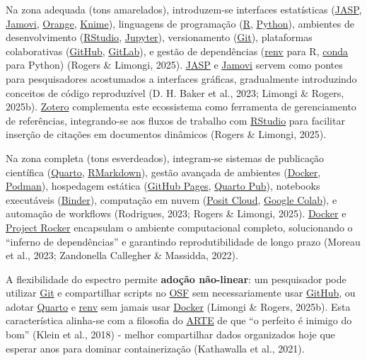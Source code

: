 \documentclass[
  a4paper,
]{book}
\begin{document}
Na zona adequada (tons amarelados), introduzem-se interfaces
estatísticas (\href{https://jasp-stats.org/}{JASP},
\href{https://www.jamovi.org/}{Jamovi},
\href{https://orangedatamining.com/}{Orange},
\href{https://www.knime.com/}{Knime}), linguagens de programação
(\href{https://www.r-project.org/}{R},
\href{https://www.python.org/}{Python}), ambientes de desenvolvimento
(\href{https://posit.co/products/open-source/rstudio/}{RStudio},
\href{https://jupyter.org/}{Jupyter}), versionamento
(\href{https://git-scm.com/}{Git}), plataformas colaborativas
(\href{https://github.com/}{GitHub},
\href{https://about.gitlab.com/}{GitLab}), e gestão de dependências
(\href{https://rstudio.github.io/renv/}{renv} para R,
\href{https://docs.conda.io/}{conda} para Python) (Rogers \& Limongi,
2025). \href{https://jasp-stats.org/}{JASP} e
\href{https://www.jamovi.org/}{Jamovi} servem como pontes para
pesquisadores acostumados a interfaces gráficas, gradualmente
introduzindo conceitos de código reproduzível (D. H. Baker et al., 2023;
Limongi \& Rogers, 2025b). \href{https://www.zotero.org/}{Zotero}
complementa este ecossistema como ferramenta de gerenciamento de
referências, integrando-se aos fluxos de trabalho com
\href{https://posit.co/products/open-source/rstudio/}{RStudio} para
facilitar inserção de citações em documentos dinâmicos (Rogers \&
Limongi, 2025).

Na zona completa (tons esverdeados), integram-se sistemas de publicação
científica (\href{https://quarto.org/}{Quarto},
\href{https://rmarkdown.rstudio.com/}{RMarkdown}), gestão avançada de
ambientes (\href{https://www.docker.com/}{Docker},
\href{https://podman.io/}{Podman}), hospedagem estática
(\href{https://pages.github.com/}{GitHub Pages},
\href{https://quartopub.com/}{Quarto Pub}), notebooks executáveis
(\href{https://mybinder.org/}{Binder}), computação em nuvem
(\href{https://posit.cloud/}{Posit Cloud},
\href{https://colab.research.google.com/}{Google Colab}), e automação de
workflows (Rodrigues, 2023; Rogers \& Limongi, 2025).
\href{https://www.docker.com/}{Docker} e
\href{https://rocker-project.org/}{Project Rocker} encapsulam o ambiente
computacional completo, solucionando o ``inferno de dependências'' e
garantindo reprodutibilidade de longo prazo (Moreau et al., 2023;
Zandonella Callegher \& Massidda, 2022).

A flexibilidade do espectro permite \textbf{adoção não-linear}: um
pesquisador pode utilizar \href{https://git-scm.com/}{Git} e
compartilhar scripts no \href{https://osf.io/}{OSF} sem necessariamente
usar \href{https://github.com/}{GitHub}, ou adotar
\href{https://quarto.org/}{Quarto} e
\href{https://rstudio.github.io/renv/}{renv} sem jamais usar
\href{https://www.docker.com/}{Docker} (Limongi \& Rogers, 2025b). Esta
característica alinha-se com a filosofia do
\href{https://phdpablo.github.io/article-template/}{ARTE} de que ``o
perfeito é inimigo do bom'' (Klein et al., 2018) - melhor compartilhar
dados organizados hoje que esperar anos para dominar containerização
(Kathawalla et al., 2021).
\end{document}
